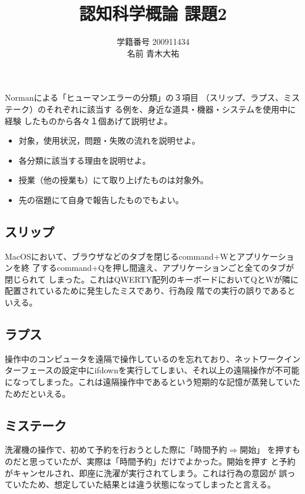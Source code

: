 \documentclass[a4j,9pt]{jsarticle}
\title{認知科学概論 課題2}
\author{学籍番号 200911434 \\ 名前 青木大祐}
\begin{document}
\maketitle


\begin{screen}

Normanによる「ヒューマンエラーの分類」の３項目
（スリップ、ラプス、ミステーク）のそれぞれに該当す
る例を、身近な道具・機器・システムを使用中に経験
したものから各々１個あげて説明せよ。
\begin{itemize}
 \item 対象，使用状況，問題・失敗の流れを説明せよ。
 \item 各分類に該当する理由を説明せよ。
 \item 授業（他の授業も）にて取り上げたものは対象外。
 \item 先の宿題にて自身で報告したものでもよい。
\end{itemize}

\end{screen}
\vspace*{2zh}

\subsection*{スリップ}
MacOSにおいて、ブラウザなどのタブを閉じるcommand+Wとアプリケーションを終
了するcommand+Qを押し間違え、アプリケーションごと全てのタブが閉じられて
しまった。これはQWERTY配列のキーボードにおいてQとWが隣に配置されているために発生したミスであり、行為段
階での実行の誤りであるといえる。

\subsection*{ラプス}
操作中のコンピュータを遠隔で操作しているのを忘れており、ネットワークイン
ターフェースの設定中にifdownを実行してしまい、それ以上の遠隔操作が不可能
になってしまった。これは遠隔操作中であるという短期的な記憶が蒸発していた
ためだといえる。

\subsection*{ミステーク}
洗濯機の操作で、初めて予約を行おうとした際に「時間予約$\Rightarrow$開始」
を押すものだと思っていたが、実際は「時間予約」だけでよかった。開始を押す
と予約がキャンセルされ、即座に洗濯が実行されてしまう。これは行為の意図が
誤っていたため、想定していた結果とは違う状態になってしまったと言える。
\end{document}
